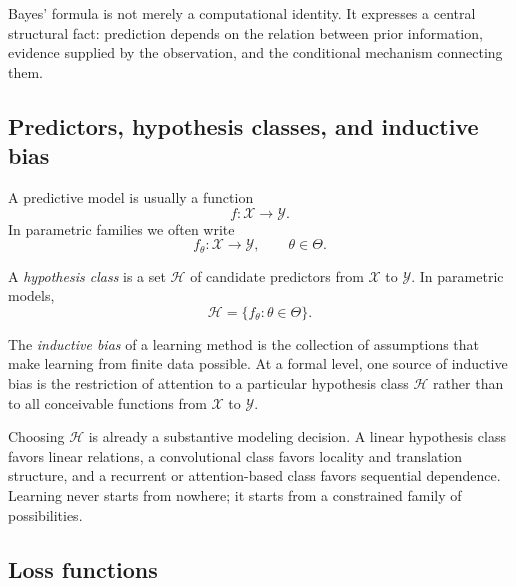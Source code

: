 Bayes' formula is not merely a computational identity. It expresses a central structural fact: prediction depends on the relation between prior information, evidence supplied by the observation, and the conditional mechanism connecting them.


\subsection*{Predictors, hypothesis classes, and inductive bias}

A predictive model is usually a function
\[
f:\mathcal X\to\mathcal Y.
\]
In parametric families we often write
\[
f_\theta:\mathcal X\to\mathcal Y,
\qquad \theta\in\Theta.
\]

\begin{definition}
A \emph{hypothesis class} is a set $\mathcal H$ of candidate predictors from $\mathcal X$ to $\mathcal Y$. In parametric models,
\[
\mathcal H=\{f_\theta:\theta\in\Theta\}.
\]
\end{definition}

\begin{definition}
The \emph{inductive bias} of a learning method is the collection of assumptions that make learning from finite data possible. At a formal level, one source of inductive bias is the restriction of attention to a particular hypothesis class $\mathcal H$ rather than to all conceivable functions from $\mathcal X$ to $\mathcal Y$.
\end{definition}

Choosing $\mathcal H$ is already a substantive modeling decision. A linear hypothesis class favors linear relations, a convolutional class favors locality and translation structure, and a recurrent or attention-based class favors sequential dependence. Learning never starts from nowhere; it starts from a constrained family of possibilities.

\subsection*{Loss functions}


